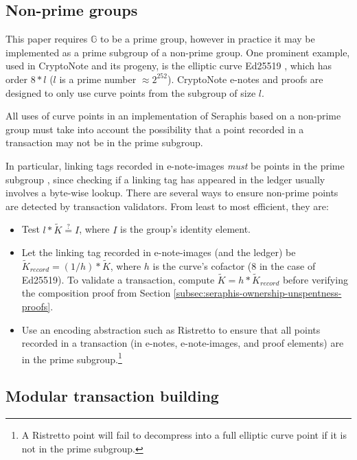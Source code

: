 \subsection{Non-prime groups}
\label{subsec:implementers-non-prime-groups}

This paper requires $\mathbb{G}$ to be a prime group, however in practice it may be implemented as a prime subgroup of a non-prime group. One prominent example, used in CryptoNote \cite{cryptoNoteWhitePaper} and its progeny, is the elliptic curve Ed25519 \cite{Bernstein2012-high-speed-high-security-ed25519}, which has order $8*l$ ($l$ is a prime number $\approx 2^{252}$). CryptoNote e-notes and proofs are designed to only use curve points from the subgroup of size $l$.

All uses of curve points in an implementation of Seraphis based on a non-prime group must take into account the possibility that a point recorded in a transaction may not be in the prime subgroup.

In particular, linking tags recorded in e-note-images {\em must} be points in the prime subgroup \cite{key-image-bug}, since checking if a linking tag has appeared in the ledger usually involves a byte-wise lookup. There are several ways to ensure non-prime points are detected by transaction validators. From least to most efficient, they are:

\begin{itemize}
    \item Test $l*\tilde{K} \stackrel{?}{=} I$, where $I$ is the group's identity element.

    \item Let the linking tag recorded in e-note-images (and the ledger) be $\tilde{K}_{record} = (1/h)*\tilde{K}$, where $h$ is the curve's cofactor (8 in the case of Ed25519). To validate a transaction, compute $\tilde{K} = h*\tilde{K}_{record}$ before verifying the composition proof from Section \ref{subsec:seraphis-ownership-unspentness-proofs}.

    \item Use an encoding abstraction such as Ristretto \cite{ristretto} to ensure that all points recorded in a transaction (in e-notes, e-note-images, and proof elements) are in the prime subgroup.\footnote{A Ristretto point will fail to decompress into a full elliptic curve point if it is not in the prime subgroup.}
\end{itemize}


\subsection{Modular transaction building}
\label{subsec:implementers-modular-tx-building}

